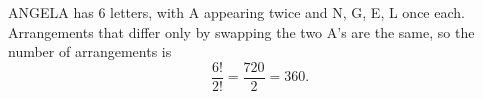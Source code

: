 ANGELA has $6$ letters, with A appearing twice and N, G, E, L once each. Arrangements that differ only by swapping the two A's are the same, so the number of arrangements is
\[
\dfrac{6!}{2!}=\dfrac{720}{2}=\boxed{360}.
\]
